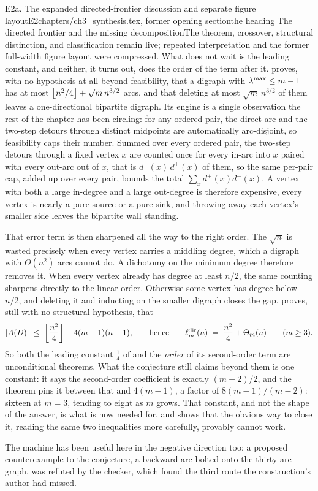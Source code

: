 \begin{offcut}{E2a. The expanded directed-frontier discussion and separate figure layout}{E2}{chapters/ch3\_synthesis.tex, former opening section}{the heading The directed frontier and the missing decomposition}{The theorem, crossover, structural distinction, and classification remain live; repeated interpretation and the former full-width figure layout were compressed.}
What does not wait is the leading constant, and neither, it turns out, does the order of the term after it.  proves, with no hypothesis at all beyond feasibility, that a digraph with $\lambda^{\max} \le m-1$ has at most $\left\lfloor n^2/4 \right\rfloor + \sqrt{m}\,n^{3/2}$ arcs, and that deleting at most $\sqrt{m}\,n^{3/2}$ of them leaves a one-directional bipartite digraph. Its engine is a single observation the rest of the chapter has been circling: for any ordered pair, the direct arc and the two-step detours through distinct midpoints are automatically arc-disjoint, so feasibility caps their number. Summed over every ordered pair, the two-step detours through a fixed vertex $x$ are counted once for every in-arc into $x$ paired with every out-arc out of $x$, that is $d^-(x)\,d^+(x)$ of them, so the same per-pair cap, added up over every pair, bounds the total $\sum_x d^+(x) d^-(x)$. A vertex with both a large in-degree and a large out-degree is therefore expensive, every vertex is nearly a pure source or a pure sink, and throwing away each vertex's smaller side leaves the bipartite wall standing.

That error term is then sharpened all the way to the right order. The $\sqrt{n}$ is wasted precisely when every vertex carries a middling degree, which a digraph with $\Theta(n^2)$ arcs cannot do. A dichotomy on the minimum degree therefore removes it. When every vertex already has degree at least $n/2$, the same counting sharpens directly to the linear order. Otherwise some vertex has degree below $n/2$, and deleting it and inducting on the smaller digraph closes the gap.  proves, still with no structural hypothesis, that
\[
    |A(D)| \;\le\; \left\lfloor \frac{n^2}{4} \right\rfloor + 4(m-1)(n-1),
    \qquad\text{hence}\qquad
    \ell_m^{\mathrm{dir}}(n) \;=\; \frac{n^2}{4} + \Theta_m(n) \qquad (m\ge3).
\]
So both the leading constant $\tfrac14$ of  and the \emph{order} of its second-order term are unconditional theorems. What the conjecture still claims beyond them is one constant: it says the second-order coefficient is exactly $(m-2)/2$, and the theorem pins it between that and $4(m-1)$, a factor of $8(m-1)/(m-2)$: sixteen at $m = 3$, tending to eight as $m$ grows. That constant, and not the shape of the answer, is what  is now needed for, and  shows that the obvious way to close it, reading the same two inequalities more carefully, provably cannot work.

The machine has been useful here in the negative direction too: a proposed counterexample to the conjecture, a backward arc bolted onto the thirty-arc graph, was refuted by the checker, which found the third route the construction's author had missed.


\end{offcut}

